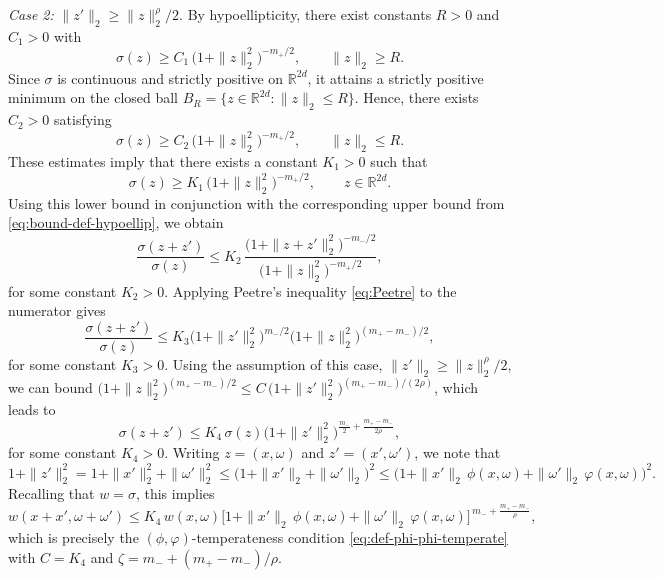 \documentclass[a4paper,12pt]{article}
\newcommand{\R}{\mathbb{R}}
\begin{document}
\noindent\emph{Case 2:} $\|z'\|_2 \ge \|z\|_2^{\rho}/2$. By hypoellipticity, there exist constants $R>0$ and $C_1>0$ 
with
\[
\sigma(z)\ge C_1\,\bigl(1+\|z\|_2^2\bigr)^{-m_+/2},
\qquad \|z\|_2\ge R.
\]
Since $\sigma$ is continuous and strictly positive on $\R^{2d}$, it attains a
strictly positive minimum on the closed ball
$B_R=\{z\in\R^{2d}:\|z\|_2\le R\}$.
Hence, there exists $C_2>0$ satisfying
\[
\sigma(z)\ge C_2\,\bigl(1+\|z\|_2^2\bigr)^{-m_+/2},
\qquad \|z\|_2\le R.
\]
These estimates imply that there exists a constant $K_1>0$ such that
\[
\sigma(z)\ge K_1\,\bigl(1+\|z\|_2^2\bigr)^{-m_+/2},
\qquad z\in\R^{2d}.
\]
Using this lower bound in conjunction with the corresponding upper bound from
\eqref{eq:bound-def-hypoellip}, we obtain
\[
    \frac{\sigma(z+z')}{\sigma(z)}
    \le
   K_2\,
    \frac{\bigl(1+\|z+z'\|_2^2\bigr)^{-m_-/2}}
         {\bigl(1+\|z\|_2^2\bigr)^{-m_+/2}},
\]
for some constant $K_2>0$.
Applying Peetre’s inequality \eqref{eq:Peetre} to the numerator gives
\[
    \frac{\sigma(z+z')}{\sigma(z)}
    \le
    K_3
    \bigl(1+\|z'\|_2^2\bigr)^{m_-/2}
    \bigl(1+\|z\|_2^2\bigr)^{(m_+-m_-)/2},
\]
for some constant $K_3>0$. Using the assumption of this case,
$\|z'\|_2 \ge \|z\|_2^{\rho}/2$, we can bound
$\bigl(1+\|z\|_2^2\bigr)^{(m_+-m_-)/2}
\le
C\,\bigl(1+\|z'\|_2^2\bigr)^{(m_+-m_-)/(2\rho)}$,
which leads to
\begin{equation}\label{eq:proof-weight-temperate-DR5}
    \sigma(z+z')
    \le
    K_4\,\sigma(z)
    \bigl(1+\|z'\|_2^2\bigr)^{\frac{m_-}{2}+\frac{m_+-m_-}{2\rho}},
\end{equation}
for some constant $K_4>0$. Writing $z=(x,\omega)$ and $z'=(x',\omega')$, we note that
\[
    1+\|z'\|_2^2
    =
    1+\|x'\|_2^2+\|\omega'\|_2^2
    \le
    \bigl(1+\|x'\|_2+\|\omega'\|_2\bigr)^2
    \le
    \bigl(1+\|x'\|_2\,\phi(x,\omega)
           +\|\omega'\|_2\,\varphi(x,\omega)\bigr)^2 .
\]
Recalling that $w=\sigma$, this implies
\[
    w(x+x',\omega+\omega')
    \le
    K_4\,w(x,\omega)
    \bigl[1+\|x'\|_2\,\phi(x,\omega)
          +\|\omega'\|_2\,\varphi(x,\omega)\bigr]^{\,m_-+\frac{m_+-m_-}{\rho}},
\]
which is precisely the $(\phi,\varphi)$-temperateness condition
\eqref{eq:def-phi-phi-temperate} with
$C=K_4$ and $\zeta = m_- + (m_+-m_-)/\rho$.
\end{document}
